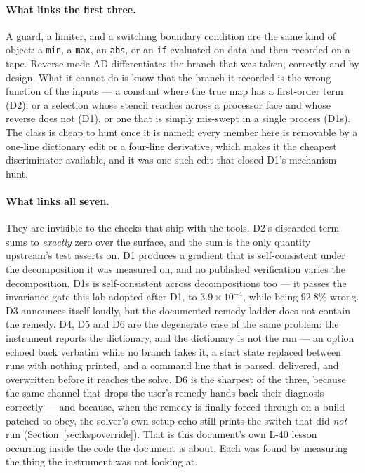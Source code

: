 \documentclass[11pt,a4paper]{article}
\begin{document}
\paragraph{What links the first three.} A guard, a limiter, and a switching boundary
condition are the same kind of object: a \texttt{min}, a \texttt{max}, an \texttt{abs}, or an
\texttt{if} evaluated on data and then recorded on a tape. Reverse-mode AD differentiates
the branch that was taken, correctly and by design. What it cannot do is know that the
branch it recorded is the wrong function of the inputs --- a constant where the true map has
a first-order term (D2), or a selection whose stencil reaches across a processor face and
whose reverse does not (D1), or one that is simply mis-swept in a single process (D1s). The
class is cheap to hunt once it is named: every member here is removable by a one-line
dictionary edit or a four-line derivative, which makes it the cheapest discriminator
available, and it was one such edit that closed D1's mechanism hunt.

\paragraph{What links all seven.} They are invisible to the checks that ship with the tools.
D2's discarded term sums to \emph{exactly} zero over the surface, and the sum is the only
quantity upstream's test asserts on. D1 produces a gradient that is self-consistent under the
decomposition it was measured on, and no published verification varies the decomposition.
D1s is self-consistent across decompositions too --- it passes the invariance gate this lab
adopted after D1, to \(3.9\times10^{-4}\), while being 92.8\% wrong. D3 announces itself
loudly, but the documented remedy ladder does not contain the remedy. D4, D5 and D6 are the
degenerate case of the same problem: the instrument reports the dictionary, and the dictionary
is not the run --- an option echoed back verbatim while no branch takes it, a start state
replaced between runs with nothing printed, and a command line that is parsed, delivered, and
overwritten before it reaches the solve. D6 is the sharpest of the three, because the same
channel that drops the user's remedy hands back their diagnosis correctly --- and because, when
the remedy is finally forced through on a build patched to obey, the solver's own setup echo
still prints the switch that did \emph{not} run (Section~\ref{sec:kspoverride}). That is this
document's own L-40 lesson occurring inside the code the document is about. Each was found by measuring the thing the
instrument was not looking at.
\end{document}
